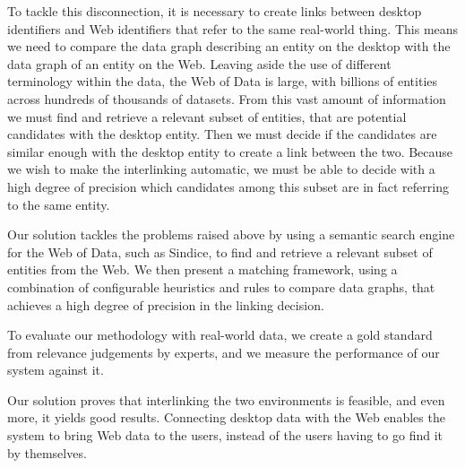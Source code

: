 To tackle this disconnection, it is necessary to create links between desktop identifiers and Web identifiers that refer to the same real-world thing.
This means we need to compare the data graph describing an entity on the desktop with the data graph of an entity on the Web. Leaving aside the use of different terminology within the data, the Web of Data is large, with billions of entities across hundreds of thousands of datasets. From this vast amount of information we must find and retrieve a relevant subset of entities, that are potential candidates with the desktop entity. Then we must decide if the candidates are similar enough with the desktop entity to create a link between the two. Because we wish to make the interlinking automatic, we must be able to decide with a high degree of precision which candidates among this subset are in fact referring to the same entity.

Our solution tackles the problems raised above by using a semantic search engine for the Web of Data, such as Sindice, to find and retrieve
a relevant subset of entities from the Web. We then present a matching framework, using a combination of configurable heuristics and rules to
compare data graphs, that achieves a high degree of precision in the linking decision. 

To evaluate our methodology with real-world data, we create a gold standard from relevance judgements by experts, and we measure the performance of our system against it.

Our solution proves that interlinking the two environments is feasible, and even more, it yields good results. Connecting desktop data with the Web enables the system to bring Web data to the users, instead of the users having to go find it by themselves.

